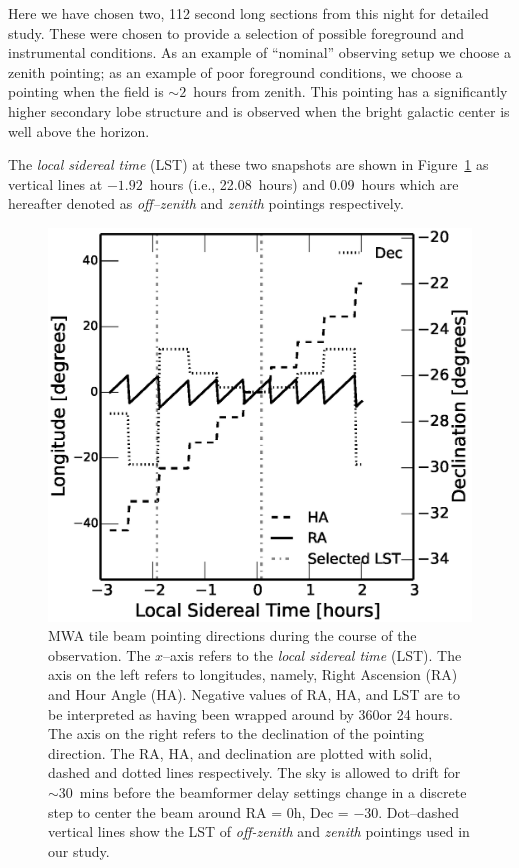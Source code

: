 \documentclass[preprint2,iop,numberedappendix]{emulateapj}
\begin{document}
Here we have chosen two, 112 second long sections from this night for detailed study. These were chosen to provide a selection of possible foreground and instrumental conditions. As an example of ``nominal'' observing setup we choose a zenith pointing; as an example of poor foreground conditions, we choose a pointing when the field is $\sim 2$~hours from zenith. This pointing has a significantly higher secondary lobe structure and is observed when the bright galactic center is well above the horizon. 

The {\it local sidereal time} (LST) at these two snapshots are shown in Figure~\ref{fig:pointings} as vertical lines at $-1.92$~hours (i.e., 22.08~hours) and 0.09~hours which are hereafter denoted as {\it off--zenith} and {\it zenith} pointings respectively. %


\begin{figure}[htb]
\centering
\includegraphics[width=\linewidth]{figures/v1_0/custom_pointings.eps}
\caption{MWA tile beam pointing directions during the course of the observation. The $x$--axis refers to the {\it local sidereal time} (LST). The axis on the left refers to longitudes, namely, Right Ascension (RA) and Hour Angle (HA). Negative values of RA, HA, and LST are to be interpreted as having been wrapped around by 360\arcdeg or 24 hours. The axis on the right refers to the declination of the pointing direction. The RA, HA, and declination are plotted with solid, dashed and dotted lines respectively. The sky is allowed to drift for $\sim 30$~mins before the beamformer delay settings change in a discrete step to center the beam around RA = 0h, Dec = $-30$\arcdeg. Dot--dashed vertical lines show the LST of {\it off-zenith} and {\it zenith} pointings used in our study. \label{fig:pointings}}
\end{figure}
\end{document}
